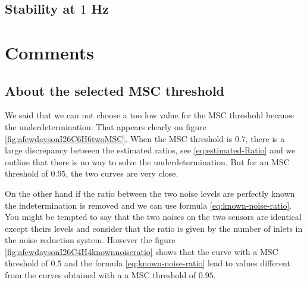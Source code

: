 
\newpage\clearpage
\subsection{Stability at $1$ Hz}

\newpage\clearpage
\section{Comments}
\subsection{About the selected MSC threshold}
We said that we can not choose a too low value for the MSC threshold because the underdetermination. That appears clearly on figure \ref{fig:afewdaysonI26C6H6twoMSC}.
When the  MSC threshold is $0.7$, there is a large discrepancy between the estimated ratios, see \eqref{eq:estimated-Ratio} and we outline that there is no way to solve the underdetermination. But for an MSC threshold of $0.95$, the two curves are very close.


On the other hand if the ratio between the two noise levels are perfectly known the indetermination is removed and we can use formula \eqref{eq:known-noise-ratio}. You might be tempted to say that the two noises on the two sensors are identical except theirs levels and consider that the ratio is given by the number of inlets in the noise reduction system. However the figure \ref{fig:afewdaysonI26C4H4knownnoiseratio} shows that the curve with a MSC threshold of $0.5$ and the formula \eqref{eq:known-noise-ratio} lead to values different from the curves obtained with a a MSC threshold of $0.95$.


